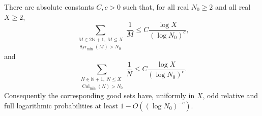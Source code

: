 \begin{theorem}
\label{thm:Tao-main-alt-repaired}
There are absolute constants \(C,c>0\) such that, for all real
\(N_0\geq2\) and all real \(X\geq2\),
\begin{equation}
\label{eq:Tao-main-alt-odd}
 \sum_{\substack{M\in2\mathbb N+1,\ M\leq X\\
       \operatorname{Syr}_{\min}(M)>N_0}}
       \frac1M
 \leq C\frac{\log X}{(\log N_0)^c},
\end{equation}
and
\begin{equation}
\label{eq:Tao-main-alt-collatz}
 \sum_{\substack{N\in\mathbb N+1,\ N\leq X\\
       \operatorname{Col}_{\min}(N)>N_0}}
       \frac1N
 \leq C\frac{\log X}{(\log N_0)^c}.
\end{equation}
Consequently the corresponding good sets have, uniformly in \(X\), odd
relative and full logarithmic probabilities at least
\(1-O((\log N_0)^{-c})\).
\end{theorem}

